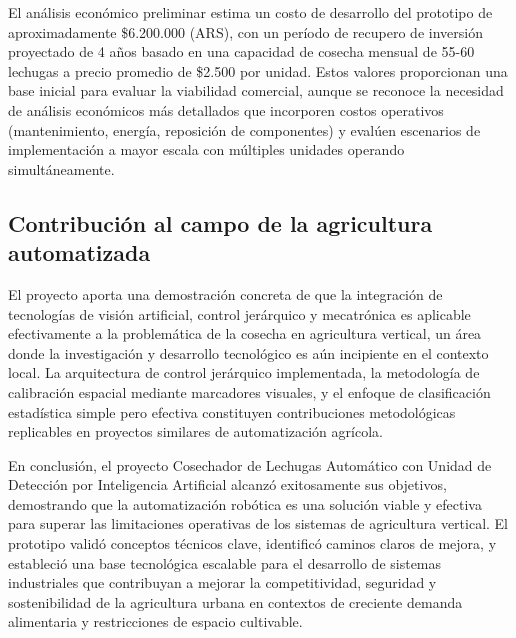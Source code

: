 El análisis económico preliminar estima un costo de desarrollo del prototipo de aproximadamente \$6.200.000 (ARS), con un período de recupero de inversión proyectado de 4 años basado en una capacidad de cosecha mensual de 55-60 lechugas a precio promedio de \$2.500 por unidad. Estos valores proporcionan una base inicial para evaluar la viabilidad comercial, aunque se reconoce la necesidad de análisis económicos más detallados que incorporen costos operativos (mantenimiento, energía, reposición de componentes) y evalúen escenarios de implementación a mayor escala con múltiples unidades operando simultáneamente.

\subsection*{Contribución al campo de la agricultura automatizada}

El proyecto aporta una demostración concreta de que la integración de tecnologías de visión artificial, control jerárquico y mecatrónica es aplicable efectivamente a la problemática de la cosecha en agricultura vertical, un área donde la investigación y desarrollo tecnológico es aún incipiente en el contexto local. La arquitectura de control jerárquico implementada, la metodología de calibración espacial mediante marcadores visuales, y el enfoque de clasificación estadística simple pero efectiva constituyen contribuciones metodológicas replicables en proyectos similares de automatización agrícola.

En conclusión, el proyecto Cosechador de Lechugas Automático con Unidad de Detección por Inteligencia Artificial alcanzó exitosamente sus objetivos, demostrando que la automatización robótica es una solución viable y efectiva para superar las limitaciones operativas de los sistemas de agricultura vertical. El prototipo validó conceptos técnicos clave, identificó caminos claros de mejora, y estableció una base tecnológica escalable para el desarrollo de sistemas industriales que contribuyan a mejorar la competitividad, seguridad y sostenibilidad de la agricultura urbana en contextos de creciente demanda alimentaria y restricciones de espacio cultivable.